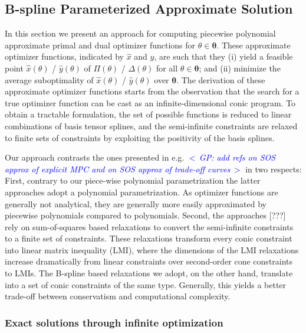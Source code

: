 \documentclass{article}
\newcommand{\commentGP}[1]{\noindent \textcolor{blue}{\emph{$<\,$GP: #1$\,>$}}}%
\newcommand{\ppar}{\theta}                          %
\newcommand{\Ppar}{{\bm{\theta}}}                   %
\begin{document}

\subsection{B-spline Parameterized Approximate Solution}\label{subsec:parameterized_solution}%

In this section we present an approach for computing piecewise polynomial approximate primal and dual optimizer functions for $\ppar\in\Ppar$. These approximate optimizer functions, indicated by $\hat{x}$ and $\hat{y}$, are such that they (i) yield a feasible point $\hat{x}(\ppar)$ / $\hat{y}(\ppar)$ of $\Pi(\ppar)$ / $\Delta(\ppar)$ for all $\ppar\in\Ppar$; and (ii) minimize the average suboptimality of $\hat{x}(\ppar)$ / $\hat{y}(\ppar)$ over $\Ppar$. The derivation of these approximate optimizer functions starts from the observation that the search for a true optimizer function can be cast as an infinite-dimensional conic program. To obtain a tractable formulation, the set of possible functions is reduced to linear combinations of basis tensor splines, and the semi-infinite constraints are relaxed to finite sets of constraints by exploiting the positivity of the basis splines.

Our approach contrasts the ones presented in e.g. \commentGP{add refs on SOS approx of explicit MPC and on SOS approx of trade-off curves} in two respects: First, contrary to our piece-wise polynomial parametrization the latter approaches adopt a polynomial parametrization. As optimizer functions are generally not analytical, they are generally more easily approximated by piecewise polynomials compared to polynomials. Second, the approaches [???] rely on sum-of-squares based relaxations to convert the semi-infinite constraints to a finite set of constraints. These relaxations transform every conic constraint into linear matrix inequality (LMI), where the dimensions of the LMI relaxations increase dramatically from linear constraints over second-order cone constraints to LMIs. The B-spline based relaxations we adopt, on the other hand, translate into a set of conic constraints of the same type. Generally, this yields a better trade-off between conservatism and computational complexity.


\subsubsection{Exact solutions through infinite optimization}%
\end{document}
